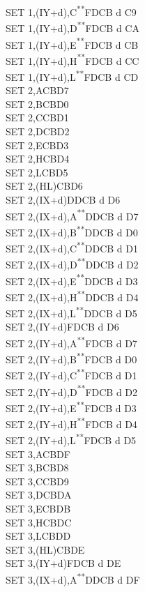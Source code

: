 \documentclass[12pt,twoside,openright,a4paper]{book}
\newcommand{\UNDOC}{\textnormal{\textsuperscript{**}}}
\begin{document}
\begin{multicols}{3}
{\begin{tabbing}
		SET 1,(IY+d),C\UNDOC\>FDCB d C9\\
		SET 1,(IY+d),D\UNDOC\>FDCB d CA\\
		SET 1,(IY+d),E\UNDOC\>FDCB d CB\\
		SET 1,(IY+d),H\UNDOC\>FDCB d CC\\
		SET 1,(IY+d),L\UNDOC\>FDCB d CD\\
		SET 2,A\>CBD7\\
		SET 2,B\>CBD0\\
		SET 2,C\>CBD1\\
		SET 2,D\>CBD2\\
		SET 2,E\>CBD3\\
		SET 2,H\>CBD4\\
		SET 2,L\>CBD5\\
		SET 2,(HL)\>CBD6\\
		SET 2,(IX+d)\>DDCB d D6\\
		SET 2,(IX+d),A\UNDOC\>DDCB d D7\\
		SET 2,(IX+d),B\UNDOC\>DDCB d D0\\
		SET 2,(IX+d),C\UNDOC\>DDCB d D1\\
		SET 2,(IX+d),D\UNDOC\>DDCB d D2\\
		SET 2,(IX+d),E\UNDOC\>DDCB d D3\\
		SET 2,(IX+d),H\UNDOC\>DDCB d D4\\
		SET 2,(IX+d),L\UNDOC\>DDCB d D5\\
		SET 2,(IY+d)\>FDCB d D6\\
		SET 2,(IY+d),A\UNDOC\>FDCB d D7\\
		SET 2,(IY+d),B\UNDOC\>FDCB d D0\\
		SET 2,(IY+d),C\UNDOC\>FDCB d D1\\
		SET 2,(IY+d),D\UNDOC\>FDCB d D2\\
		SET 2,(IY+d),E\UNDOC\>FDCB d D3\\
		SET 2,(IY+d),H\UNDOC\>FDCB d D4\\
		SET 2,(IY+d),L\UNDOC\>FDCB d D5\\
		SET 3,A\>CBDF\\
		SET 3,B\>CBD8\\
		SET 3,C\>CBD9\\
		SET 3,D\>CBDA\\
		SET 3,E\>CBDB\\
		SET 3,H\>CBDC\\
		SET 3,L\>CBDD\\
		SET 3,(HL)\>CBDE\\
		SET 3,(IY+d)\>FDCB d DE\\
		SET 3,(IX+d),A\UNDOC\>DDCB d DF\\

\end{tabbing}}
\end{multicols}
\end{document}
